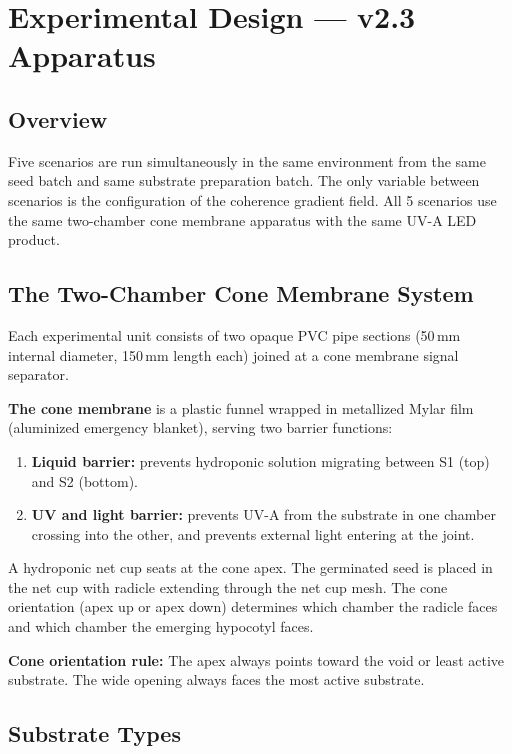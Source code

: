 \documentclass[10pt, a4paper]{article}
\begin{document}
\vspace{0.5em}

\section{Experimental Design --- v2.3 Apparatus}

\subsection{Overview}

Five scenarios are run simultaneously in the same
environment from the same seed batch and same
substrate preparation batch.
The only variable between scenarios is the configuration
of the coherence gradient field.
All 5 scenarios use the same two-chamber cone membrane
apparatus with the same UV-A LED product.

\subsection{The Two-Chamber Cone Membrane System}

Each experimental unit consists of two opaque PVC pipe
sections (50\,mm internal diameter, 150\,mm length each)
joined at a cone membrane signal separator.

\textbf{The cone membrane} is a plastic funnel wrapped in
metallized Mylar film (aluminized emergency blanket),
serving two barrier functions:
\begin{enumerate}[itemsep=0.1em]
  \item \textbf{Liquid barrier:} prevents hydroponic
    solution migrating between S1 (top) and S2 (bottom).
  \item \textbf{UV and light barrier:} prevents UV-A
    from the substrate in one chamber crossing into the
    other, and prevents external light entering at the
    joint.
\end{enumerate}

A hydroponic net cup seats at the cone apex.
The germinated seed is placed in the net cup with
radicle extending through the net cup mesh.
The cone orientation (apex up or apex down) determines
which chamber the radicle faces and which chamber the
emerging hypocotyl faces.

\textbf{Cone orientation rule:}
The apex always points toward the void or least active
substrate. The wide opening always faces the most
active substrate.

\subsection{Substrate Types}
\end{document}
